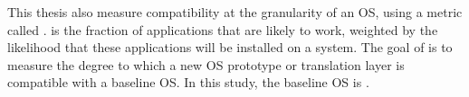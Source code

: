 \begin{comment}
\paragraph{Formal Definition.}
A given system installation ($\mathtt{Inst}$)
is a set of packages installed ($\{\mathtt{pkg}_1, \mathtt{pkg}_2, ..., \mathtt{pkg}_k \in \mathtt{Pkg}_\mathtt{all}\}$).
For each package $\mathtt{pkg}$ in the \osdist{} repository,
our framework generates the API footprint as 
${\mathtt{Footprint}}_\mathtt{pkg} = \{\mathtt{api}_1, \mathtt{api}_2, ..., \mathtt{api}_k \in \mathtt{API}_\mathtt{all}\}$.  
For an API supported by the OS, we calculate the \usagemetric{} as the product 
of probabilities that an installed package will require this API.
This is calculated as follows:
\begin{align*}
&\mathtt{Dependent}_\mathtt{api} = \{\mathtt{pkg}|\mathtt{api} \in \mathtt{Footprint}_\mathtt{pkg}\} \\
&\mathtt{Importance}(\mathtt{api}) = Pr\{\mathtt{Dependent}_\mathtt{api} \bigcap \mathtt{Inst} \neq \emptyset\} \\
&= 1 - Pr\{\forall \mathtt{pkg} \in \mathtt{Dependent}_\mathtt{api}, \mathtt{pkg} \notin \mathtt{Inst}\} \\
&= 1 - \prod_{\mathtt{pkg} \in \mathtt{Dependent}_\mathtt{api}} Pr\{\mathtt{pkg} \notin \mathtt{Inst}\} \\
&= 1 - \prod_{\mathtt{pkg} \in \mathtt{Dependent}_\mathtt{api}} (1 - \frac{\text{installation of $\mathtt{pkg}$}}{\text{total installation}})
\end{align*}
\end{comment}


\papersubsection{\Compatmetric{}}

This thesis also measure compatibility at the granularity of an OS,
using a metric called \compatmetric{}.
\Compatmetric{} is the fraction of applications that are likely to work,
weighted by the likelihood that these applications will be installed on a system.
The goal of \compatmetric{} is to measure the degree to which a
new OS prototype or translation layer is compatible with a baseline OS.
In this study, the baseline OS is \osdist{}.





